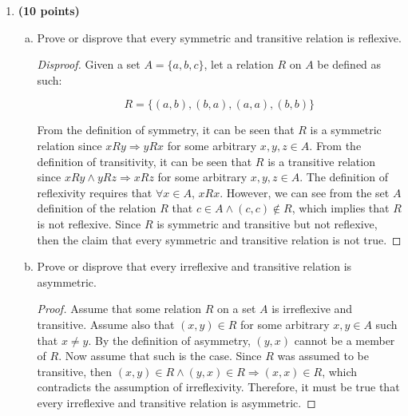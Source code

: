 \documentclass[11pt]{article}
\begin{document}
\begin{enumerate}
\item \textbf{(10 points)} 
\begin{enumerate}[(a)]
\item Prove or disprove that every symmetric and transitive relation is reflexive.  
\begin{proof}[Disproof]
Given a set $A = \{a,b,c\}$, let a relation $R$ on $A$ be defined as such: 

\begin{equation*}
R=\{(a,b),(b,a),(a,a),(b,b)\}
\end{equation*}

From the definition of symmetry, it can be seen that $R$ is a symmetric relation since $xRy \Rightarrow yRx$ for some arbitrary $x,y,z\in A$. From the definition of transitivity, it can be seen that $R$ is a transitive relation since $xRy \wedge yRz \Rightarrow xRz$ for some arbitrary $x,y,z\in A$. The definition of reflexivity requires that $\forall x\in A$, $xRx$. However, we can see from the set $A$ definition of the relation $R$ that $c\in A \wedge (c,c)\notin R$, which implies that $R$ is not reflexive. Since $R$ is symmetric and transitive but not reflexive, then the claim that every symmetric and transitive relation is not true.
\end{proof}

\item Prove or disprove that every irreflexive and transitive relation is asymmetric.  
\begin{proof}
Assume that some relation $R$ on a set $A$ is irreflexive and transitive. Assume also that $(x,y)\in R$ for some arbitrary $x,y\in A$ such that $x \neq y$. By the definition of asymmetry, $(y,x)$ cannot be a member of $R$. Now assume that such is the case. Since $R$ was assumed to be transitive, then $(x,y)\in R\wedge(y,x)\in R \Rightarrow (x,x)\in R$, which contradicts the assumption of irreflexivity. Therefore, it must be true that every irreflexive and transitive relation is asymmetric.
\end{proof}
\end{enumerate}
\end{enumerate}
\end{document}
